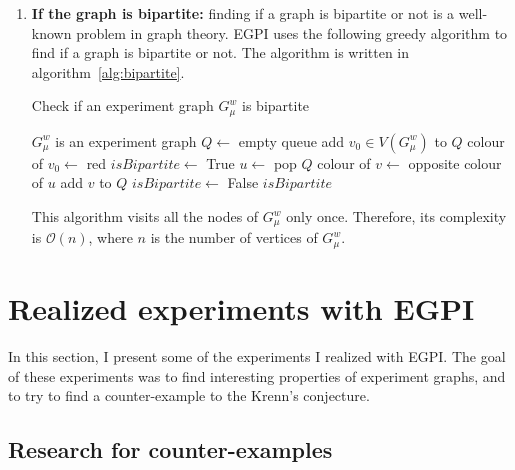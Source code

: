 \begin{enumerate}
    \item \textbf{If the graph is bipartite:} finding if a graph is bipartite or not is a well-known problem in graph theory.
        EGPI uses the following greedy algorithm to find if a graph is bipartite or not.
        The algorithm is written in algorithm~\ref{alg:bipartite}.
        \begin{algorithm}
            \caption{Check if an experiment graph $G_\mu^w$ is bipartite}
            \label{alg:bipartite}
            \begin{algorithmic}
                \Require $G_\mu^w$ is an experiment graph
                \State $Q \gets$ empty queue
                \State add $v_0 \in V(G_\mu^w)$ to $Q$
                \State colour of $v_0 \gets$ red
                \State $isBipartite \gets$ True
                    \State $u \gets$ pop $Q$
                            \State colour of $v \gets$ opposite colour of $u$
                            \State add $v$ to $Q$
                            \State $isBipartite \gets$ False
                        \EndIf
                    \EndFor
                \EndWhile
                \State \Return $isBipartite$
            \end{algorithmic}
        \end{algorithm}

        This algorithm visits all the nodes of $G_\mu^w$ only once.
        Therefore, its complexity is $\mathcal{O}(n)$, where $n$ is the number of vertices of $G_\mu^w$.

\end{enumerate}


\section{Realized experiments with EGPI}
\label{sec:realized_experiments}

In this section, I present some of the experiments I realized with EGPI. The goal of these experiments was to find interesting properties of experiment graphs, and to try to find a counter-example to the Krenn's conjecture.\\

\subsection{Research for counter-examples}
\label{subsec:research-for-counter-examples}

